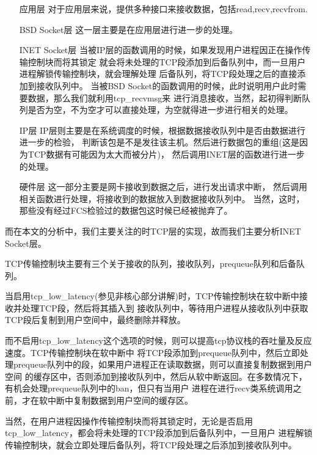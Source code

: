 \begin{enumerate}
\item[应用层]           对于应用层来说，提供多种接口来接收数据，包括read,recv,recvfrom.
\item[BSD Socket层]     这一层主要是在应用层进行进一步的处理。
\item[INET Socket层]        当被IP层的函数调用的时候，如果发现用户进程因正在操作传输控制块而将其锁定
                        就会将未处理的TCP段添加到后备队列中，而一旦用户进程解锁传输控制块，就会理解处理
                        后备队列，将TCP段处理之后的直接添加到接收队列中。
                        当被BSD Socket的函数调用的时候，此时说明用户此时需要数据，那么我们就利用tcp\_recvmsg来
                        进行消息接收，当然，起初得判断队列是否为空，不为空才可以直接处理，为空就得进一步进行相关的处理。
\item[IP层]
                IP层则主要是在系统调度的时候，根据数据接收队列中是否由数据进行进一步的检验，
                判断该包是不是发往该主机。然后进行数据包的重组(这是因为TCP数据有可能因为太大而被分片)，
                然后调用INET层的函数进行进一步的处理。
\item[硬件层]     这一部分主要是网卡接收到数据之后，进行发出请求中断，
                  然后调用相关函数进行处理，将接收到的数据放入到数据接收队列中。
                    当然，这时，那些没有经过FCS检验过的数据包这时候已经被抛弃了。
\end{enumerate}

        而在本文的分析中，我们主要关注的时TCP层的实现，故而我们主要分析INET Socket层。

        TCP传输控制块主要有三个关于接收的队列，接收队列，prequeue队列和后备队列。

        当启用tcp\_low\_latency(参见非核心部分讲解)时，TCP传输控制块在软中断中接收并处理TCP段，然后将其插入到
        接收队列中，等待用户进程从接收队列中获取TCP段后复制到用户空间中，最终删除并释放。

        而不启用tcp\_low\_latency这个选项的时候，则可以提高tcp协议栈的吞吐量及反应速度。TCP传输控制块在软中断中
        将TCP段添加到prequeue队列中，然后立即处理prequeue队列中的段，如果用户进程正在读取数据，则可以直接复制数据到用户空间
        的缓存区中，否则添加到接收队列中，然后从软中断返回。在多数情况下，有机会处理prequeue队列中的ban，但只有当用户
        进程在进行recv类系统调用之前，才在软中断中复制数据到用户空间的缓存区。

        当然，在用户进程因操作传输控制块而将其锁定时，无论是否启用tcp\_low\_latency，都会将未处理的TCP段添加到后备队列中，一旦用户
        进程解锁传输控制块，就会立即处理后备队列，将TCP段处理之后添加到接收队列中。
